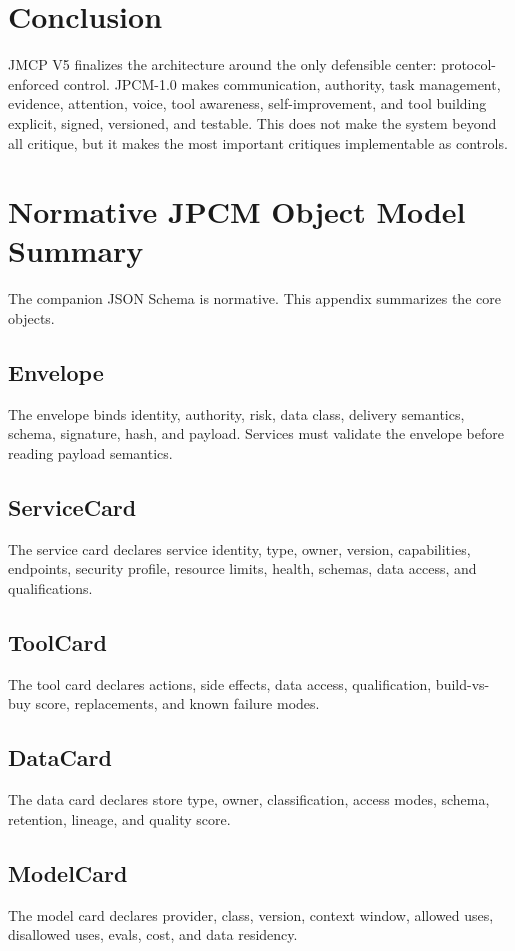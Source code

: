 \documentclass[10pt,journal,onecolumn]{IEEEtran}
\begin{document}
\section{Conclusion}
JMCP V5 finalizes the architecture around the only defensible center: protocol-enforced control. JPCM-1.0 makes communication, authority, task management, evidence, attention, voice, tool awareness, self-improvement, and tool building explicit, signed, versioned, and testable. This does not make the system beyond all critique, but it makes the most important critiques implementable as controls.

\appendices
\section{Normative JPCM Object Model Summary}
The companion JSON Schema is normative. This appendix summarizes the core objects.

\subsection{Envelope}
The envelope binds identity, authority, risk, data class, delivery semantics, schema, signature, hash, and payload. Services must validate the envelope before reading payload semantics.

\subsection{ServiceCard}
The service card declares service identity, type, owner, version, capabilities, endpoints, security profile, resource limits, health, schemas, data access, and qualifications.

\subsection{ToolCard}
The tool card declares actions, side effects, data access, qualification, build-vs-buy score, replacements, and known failure modes.

\subsection{DataCard}
The data card declares store type, owner, classification, access modes, schema, retention, lineage, and quality score.

\subsection{ModelCard}
The model card declares provider, class, version, context window, allowed uses, disallowed uses, evals, cost, and data residency.
\end{document}
